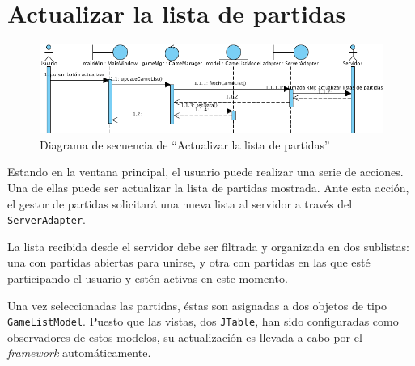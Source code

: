 \section{Actualizar la lista de partidas}

\begin{figure}[ht]
\centering
\includegraphics[scale=0.6]{img/ch03devel-listgames.png}
\caption{Diagrama de secuencia de ``Actualizar la lista de partidas''}
\end{figure}

Estando en la ventana principal, el usuario puede realizar una serie de
acciones. Una de ellas puede ser actualizar la lista de partidas mostrada. Ante
esta acción, el gestor de partidas solicitará una nueva lista al servidor a
través del \texttt{ServerAdapter}.

La lista recibida desde el servidor debe ser filtrada y organizada en dos
sublistas: una con partidas abiertas para unirse, y otra con partidas en las
que esté participando el usuario y estén activas en este momento.

Una vez seleccionadas las partidas, éstas son asignadas a dos objetos de tipo
\texttt{GameListModel}. Puesto que las vistas, dos \texttt{JTable}, han sido
configuradas como observadores de estos modelos, su actualización es llevada a
cabo por el \textit{framework} automáticamente.
